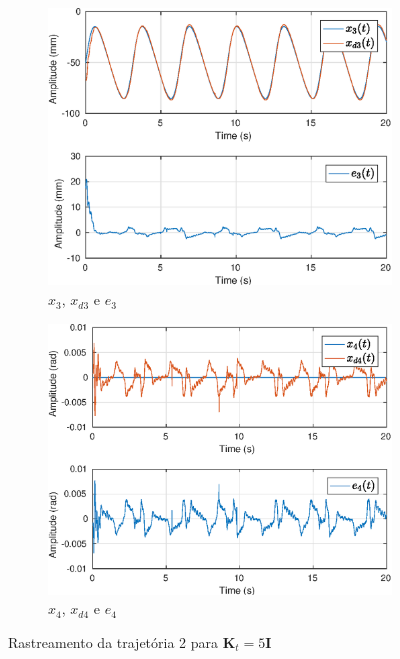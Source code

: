 \begin{figure}[H]
\begin{subfigure}{.5\textwidth}
  \centering
  \includegraphics[width=\linewidth]{./img/traj_2_k5/x3.eps}
  \caption{$x_3$, $x_{d3}$ e $e_3$}
  \label{fig:sub1}
\end{subfigure}%
\begin{subfigure}{.5\textwidth}
  \centering
  \includegraphics[width=\linewidth]{./img/traj_2_k5/x4.eps}
  \caption{$x_4$, $x_{d4}$ e $e_4$}
  \label{fig:sub2}
\end{subfigure}
\caption{Rastreamento da trajetória 2 para $\bm{K}_t = 5\bm{I}$}
\label{fig:test}
\end{figure}

